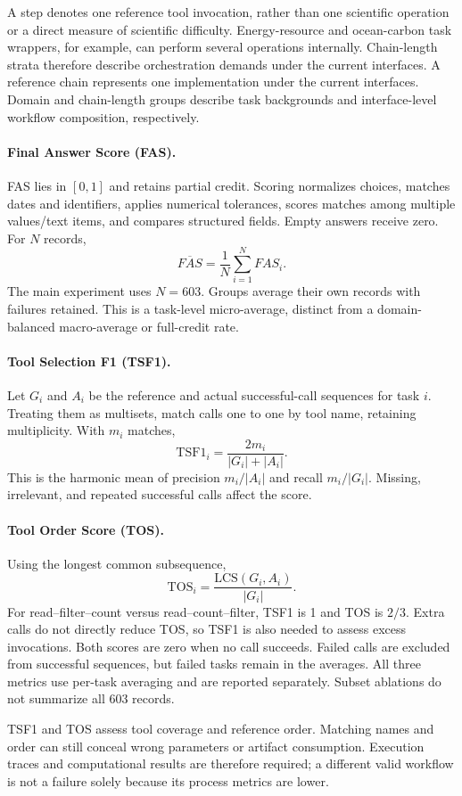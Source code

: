A step denotes one reference tool invocation, rather than one scientific operation or a direct measure of scientific difficulty. Energy-resource and ocean-carbon task wrappers, for example, can perform several operations internally. Chain-length strata therefore describe orchestration demands under the current interfaces. A reference chain represents one implementation under the current interfaces. Domain and chain-length groups describe task backgrounds and interface-level workflow composition, respectively.


\paragraph{Final Answer Score (FAS).}
FAS lies in $[0,1]$ and retains partial credit. Scoring normalizes choices, matches dates and identifiers, applies numerical tolerances, scores matches among multiple values/text items, and compares structured fields. Empty answers receive zero. For $N$ records,
\begin{equation}
\overline{FAS} = \frac{1}{N}\sum_{i=1}^{N}{FAS}_i.
\label{eq:fas}
\end{equation}
The main experiment uses $N=603$. Groups average their own records with failures retained. This is a task-level micro-average, distinct from a domain-balanced macro-average or full-credit rate.

\paragraph{Tool Selection F1 (TSF1).}
Let $G_i$ and $A_i$ be the reference and actual successful-call sequences for task $i$. Treating them as multisets, match calls one to one by tool name, retaining multiplicity. With $m_i$ matches,
\begin{equation}
\mathrm{TSF1}_i=\frac{2m_i}{|G_i|+|A_i|}.
\label{eq:tsf1}
\end{equation}
This is the harmonic mean of precision $m_i/|A_i|$ and recall $m_i/|G_i|$. Missing, irrelevant, and repeated successful calls affect the score.

\paragraph{Tool Order Score (TOS).}
Using the longest common subsequence,
\begin{equation}
\mathrm{TOS}_i=\frac{\mathrm{LCS}(G_i,A_i)}{|G_i|}.
\label{eq:tos}
\end{equation}
For read--filter--count versus read--count--filter, TSF1 is 1 and TOS is $2/3$. Extra calls do not directly reduce TOS, so TSF1 is also needed to assess excess invocations. Both scores are zero when no call succeeds. Failed calls are excluded from successful sequences, but failed tasks remain in the averages. All three metrics use per-task averaging and are reported separately. Subset ablations do not summarize all 603 records.

TSF1 and TOS assess tool coverage and reference order. Matching names and order can still conceal wrong parameters or artifact consumption. Execution traces and computational results are therefore required; a different valid workflow is not a failure solely because its process metrics are lower.
